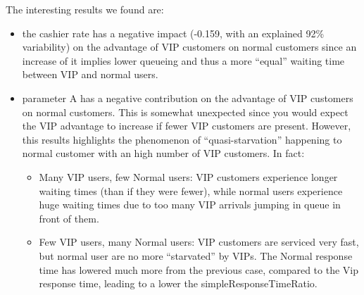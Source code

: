 The interesting results we found are:
\begin{itemize}
  \item the cashier rate has a negative impact (-0.159, with an explained 92\%
   variability) on the advantage of VIP customers 
    on normal customers since an increase of it implies lower queueing and thus 
    a more ``equal'' waiting time between VIP and normal users.
  \item parameter A has a negative contribution on the advantage of VIP       
    customers on normal customers. This is somewhat unexpected since you would 
    expect the VIP advantage to increase if fewer VIP customers are present.
    However, this results highlights the phenomenon of ``quasi-starvation''
    happening to normal customer with an high number of VIP customers. In fact:
      \begin{itemize}
        \item Many VIP users, few Normal users: VIP customers experience longer 
          waiting times (than if they were fewer), while normal users experience huge waiting times due to too many VIP arrivals jumping in queue in front of them.
        \item Few VIP users, many Normal users: VIP customers are serviced very fast, but normal user are no more ``starvated'' by VIPs. The Normal response time has lowered much more from the previous case, compared to the Vip response time, leading to a lower the simpleResponseTimeRatio.
      \end{itemize}
\end{itemize}



% 
 

